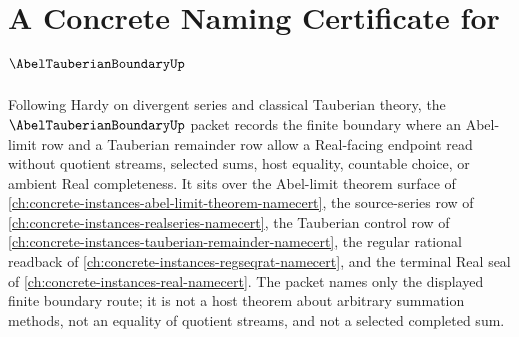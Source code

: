 \chapter{A Concrete Naming Certificate for $\AbelTauberianBoundaryUp$}
\label{ch:concrete-instances-abel-tauberian-boundary-namecert}

Following Hardy on divergent series and classical Tauberian theory, the $\AbelTauberianBoundaryUp$ packet records the finite boundary where an Abel-limit row and a Tauberian remainder row allow a Real-facing endpoint read without quotient streams, selected sums, host equality, countable choice, or ambient Real completeness. It sits over the Abel-limit theorem surface of \autoref{ch:concrete-instances-abel-limit-theorem-namecert}, the source-series row of \autoref{ch:concrete-instances-realseries-namecert}, the Tauberian control row of \autoref{ch:concrete-instances-tauberian-remainder-namecert}, the regular rational readback of \autoref{ch:concrete-instances-regseqrat-namecert}, and the terminal Real seal of \autoref{ch:concrete-instances-real-namecert}. The packet names only the displayed finite boundary route; it is not a host theorem about arbitrary summation methods, not an equality of quotient streams, and not a selected completed sum.

